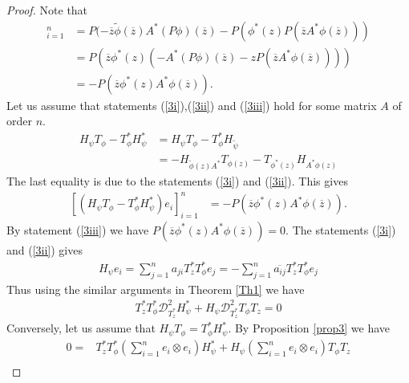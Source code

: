 \documentclass[12pt, reqno]{amsart}
\theoremstyle{definition}
\theoremstyle{remark}
\numberwithin{equation}{section}
\begin{document}
        \begin{proof}
            Note that 
            \begin{align*}
                [(-H_{\tilde \phi(z)A^*}T_{\phi(z)}-T_{\phi^*(z)}H_{A^*\phi(z)})e_i]_{i=1}^{n}&=P(-\overline z\tilde \phi(\overline z)A^*(P\phi)(\overline z)-P(\phi^*(z)P(\overline z A^* \phi(\overline z)))\\
                &=P(\overline z\phi^*(z)(-A^*(P\phi)(\overline z)-zP(\overline z A^* \phi(\overline z))))\\
                &=-P(\overline z\phi^*(z)A^*\phi(\overline{z})).
            \end{align*}
            Let us assume that statements (\ref{3i}),(\ref{3ii}) and (\ref{3iii}) hold for some matrix $A$ of order $n.$
            \begin{align*}
                H_\psi T_\phi -T^*_\phi H_\psi^*
               &=H_\psi T_\phi-T^*_\phi H_{\tilde \psi}\\
                &=-H_{\tilde \phi(z)A^*}T_{\phi(z)}-T_{\phi^*(z)}H_{A^*\phi(z)}
            \end{align*}
            The last equality is due to the statements (\ref{3i}) and (\ref{3ii}). This gives
            \begin{align}\label{symbol comparison 3}
                [(H_\psi T_\phi -T^*_\phi H_\psi^*)e_i]_{i=1}^{n}
                &=-P(\overline z\phi^*(z)A^*\phi(\overline{z})).
            \end{align}
            By statement (\ref{3iii}) we have
            $P(\overline z\phi^*(z)A^*\phi(\overline{z}))=0.$ The statements (\ref{3i}) and (\ref{3ii}) gives
            \begin{align*}
                H_\psi e_i = \sum_{j=1}^{n}a_{ji}T_z^*T^*_\phi e_j =-\sum_{j=1}^{n}\overline{a_{ij}}T^*_zT^*_\phi e_j
            \end{align*}
            Thus using the similar arguments in Theorem \ref{Th1} we have
            \begin{align*}
                {T_z^*} T_\phi^*\mathcal{D}^2_{T_z^*} H_\psi^*+H_\psi \mathcal{D}^2_{T_z^*} T_\phi T_z=0
            \end{align*}
            Conversely, let us assume that $H_\psi T_\phi =T_\phi^*H_\psi^*$.
            By Proposition \ref{prop3} we have 
           \begin{align} 
               0=&T_z^*T_\phi^* (\sum_{i=1}^{n} e_i\otimes e_i) H_\psi^* +H_\psi (\sum_{i=1}^{n} e_i\otimes e_i) {T_\phi}T_z \nonumber\\

\end{align}
\end{proof}
\end{document}
